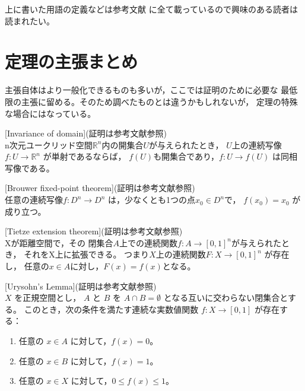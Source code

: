 \documentclass[uplatex]{jsarticle}
\begin{document}
上に書いた用語の定義などは参考文献\cite{kawazumi}
に全て載っているので興味のある読者は読まれたい。




\section{定理の主張まとめ}\label{Fact}
主張自体はより一般化できるものも多いが，ここでは証明のために必要な
最低限の主張に留める。そのため調べたものとは違うかもしれないが，
定理の特殊な場合にはなっている。

\begin{fact}\label{Fact:Invariance of domain}[Invariance of domain](証明は参考文献\cite{tao}参照)\\
    n次元ユークリッド空間$\mathbb{R}^n$内の開集合$U$が与えられたとき，
    $U$上の連続写像$f: U \rightarrow \mathbb{R}^n$ が単射であるならば，
    $f(U)$も開集合であり，$f: U \rightarrow f(U)$ は同相写像である。
\end{fact}

\begin{fact}\label{Fact:Brouwer fixed-point theorem}[Brouwer fixed-point theorem](証明は参考文献\cite{kawazumi}参照)\\
    任意の連続写像$f: D^n \rightarrow D^n$
    は，少なくとも1つの点$x_0 \in D^n$で，
    $f(x_0) = x_0$ が成り立つ。
\end{fact}


\begin{fact}\label{Fact:Tietze extension theorem}[Tietze extension theorem](証明は参考文献\cite{kawazumi}参照)\\
    Xが距離空間で，その
    閉集合$A$上での連続関数$f: A \rightarrow [0, 1]^n$が与えられたとき，
    それをX上に拡張できる。
    つまり$X$上の連続関数$F: X \rightarrow [0, 1]^n$ が存在し，
    任意の\(x\in Aに対し，F(x) = f(x)\)となる。
\end{fact}




\begin{fact}\label{Fact:Urysohn's Lemma}[Urysohn's Lemma](証明は参考文献\cite{kawazumi}参照)\\
    \(X\) を正規空間とし，
    \(A\) と \(B\) を \(A \cap B = \emptyset\) となる互いに交わらない閉集合とする。
    このとき，次の条件を満たす連続な実数値関数 \(f: X \to [0, 1]\)
    が存在する：
    \begin{enumerate}
        \item 任意の \(x \in A\) に対して，\(f(x) = 0\)。
        \item 任意の \(x \in B\) に対して，\(f(x) = 1\)。
        \item 任意の \(x \in X\) に対して，\(0 \leq f(x) \leq 1\)。
    \end{enumerate}
\end{fact}
\end{document}
